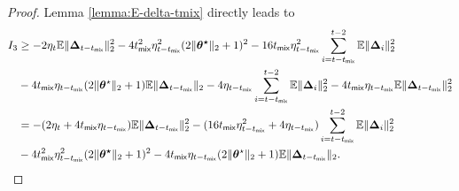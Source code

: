 \begin{proof}
Lemma \ref{lemma:E-delta-tmix} directly leads to  
\begin{align}\label{eq:markov-L2-I3-bound}
I_3 &\geq -2\eta_t\mathbb{E}\|\bm{\Delta}_{t-t_{\mathsf{mix}}}\|_2^2 - 4t_{\mathsf{mix}}^2 \eta_{t-t_{\mathsf{mix}}}^2(2\|\bm{\theta^\star}\|_2 + 1)^2 - 16 t_{\mathsf{mix}} \eta_{t-t_{\mathsf{mix}}}^2\sum_{i=t-t_{\mathsf{mix}}}^{t-2}\mathbb{E}\|\bm{\Delta}_i\|_2^2 \nonumber \\ 
&- 4t_{\mathsf{mix}}\eta_{t-t_{\mathsf{mix}}}(2\|\bm{\theta}^\star\|_2 +1)\mathbb{E}\|\bm{\Delta}_{t- t_{\mathsf{mix}}}\|_2 - 4\eta_{t - t_{\mathsf{mix}}}\sum_{i=t-t_{\mathsf{mix}}}^{t-2}\mathbb{E}\|\bm{\Delta}_i\|_2^2  - 4t_{\mathsf{mix}} \eta_{t - t_{\mathsf{mix}}} \mathbb{E}\|\bm{\Delta}_{t- t_{\mathsf{mix}}}\|_2^2 \nonumber \\ 
&= -(2\eta_t +4t_{\mathsf{mix}}\eta_{t-t_{\mathsf{mix}}})\mathbb{E}\|\bm{\Delta}_{t-t_{\mathsf{mix}}}\|_2^2 - (16 t_{\mathsf{mix}} \eta_{t-t_{\mathsf{mix}}}^2+ 4\eta_{t - t_{\mathsf{mix}}})\sum_{i=t-t_{\mathsf{mix}}}^{t-2}\mathbb{E}\|\bm{\Delta}_i\|_2^2 \nonumber \\ 
&-4t_{\mathsf{mix}}^2 \eta_{t-t_{\mathsf{mix}}}^2(2\|\bm{\theta^\star}\|_2 + 1)^2 -4t_{\mathsf{mix}}\eta_{t-t_{\mathsf{mix}}}(2\|\bm{\theta}^\star\|_2 +1)\mathbb{E}\|\bm{\Delta}_{t- t_{\mathsf{mix}}}\|_2.
\end{align}


\end{proof}
